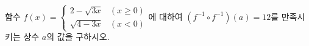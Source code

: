 함수 $f(x)=\begin{cases} 2-\sqrt{3x} & (x\ge 0) \\ \sqrt{4-3x} & (x<0) \end{cases}$에 대하여 $(f^{-1}\circ f^{-1})(a)=12$를 만족시키는 상수 $a$의 값을 구하시오.
